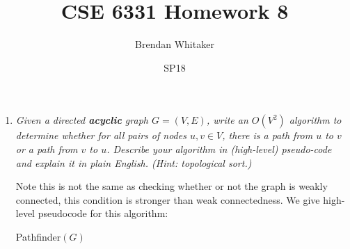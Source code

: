 \documentclass[12pt,oneside,reqno]{amsart}
\makeatletter
\theoremstyle{plain}
\theoremstyle{definition}
\theoremstyle{remark}
\newcommand{\bb}{\vspace{3mm}}
\newenvironment{restoretext}%
    {\@parboxrestore%
     \begin{adjustwidth}{}{\leftmargin}%
    }{\end{adjustwidth}
     }
\makeatother
\begin{document}
\title{CSE 6331 Homework 8}

\date{SP18}

\author[Brendan Whitaker]{Brendan Whitaker}

\maketitle



\begin{enumerate}[label=\arabic*.]

\item \textit{Given a directed \textbf{acyclic} graph $G = (V,E)$, write an $O(V^2)$ algorithm to determine whether for all pairs of nodes $u,v \in V$, there is a path from $u$ to $v$ or a path from $v$ to $u$. Describe your algorithm in (high-level) pseudo-code and explain it in plain English. (Hint: topological sort.) }


Note this is not the same as checking whether or not the graph is weakly connected, this condition is stronger than weak connectedness. We give high-level pseudocode for this algorithm:



\bb
\begin{restoretext}
\begin{algorithm}[H]\label{alg1}
\caption{Pathfinder$(G)$}
\end{algorithm}
\end{restoretext}
\bb


\end{enumerate}
\end{document}

